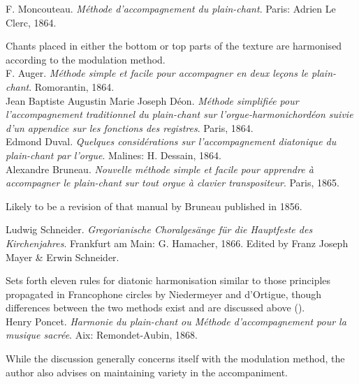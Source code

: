     \parindent=0pt
    \hangindent=0pt
  F. Moncouteau. \emph{Méthode d'accompagnement du plain-chant}. Paris:  Adrien Le Clerc, 1864.

     \parindent=20pt
     \hangindent=20pt
     Chants placed in either the bottom or top parts of the texture are harmonised according to the modulation method.\\

    \parindent=0pt
    \hangindent=0pt
  \covid{}F. Auger. \emph{Méthode simple et facile pour accompagner en deux leçons le plain-chant}. Romorantin, 1864. \\

    \parindent=0pt
    \hangindent=0pt
  \covid{}Jean Baptiste Augustin Marie Joseph Déon. \emph{Méthode simplifiée pour l'accompagnement traditionnel du plain-chant sur l'orgue-harmonichordéon suivie d'un appendice sur les fonctions des registres}. Paris, 1864. \\

    \parindent=0pt
    \hangindent=0pt
  \covid{}Edmond Duval. \emph{Quelques considérations sur l'accompagnement diatonique du plain-chant par l'orgue}. Malines:  H. Dessain, 1864. \\

    \parindent=0pt
    \hangindent=0pt
  \covid{}Alexandre Bruneau. \emph{Nouvelle méthode simple et facile pour apprendre à accompagner le plain-chant sur tout orgue à clavier transpositeur}. Paris, 1865.

     \parindent=20pt
     \hangindent=20pt
     Likely to be a revision of that manual by Bruneau published in 1856.\\\pagebreak{}

    \parindent=0pt
    \hangindent=0pt
  Ludwig Schneider. \emph{Gregorianische Choralgesänge für die Hauptfeste des Kirchenjahres}. Frankfurt am Main:  G. Hamacher, 1866. Edited by Franz Joseph Mayer \& Erwin Schneider.

     \parindent=20pt
     \hangindent=20pt
     Sets forth eleven rules for diatonic harmonisation similar to those principles propagated in Francophone circles by Niedermeyer and d'Ortigue, though differences between the two methods exist and are discussed above (). \\

    \parindent=0pt
    \hangindent=0pt
  Henry Poncet. \emph{Harmonie du plain-chant ou Méthode d'accompagnement pour la musique sacrée}. Aix:  Remondet-Aubin, 1868.

     \parindent=20pt
     \hangindent=20pt
     While the discussion generally concerns itself with the modulation method, the author also advises on maintaining variety in the accompaniment.\\

